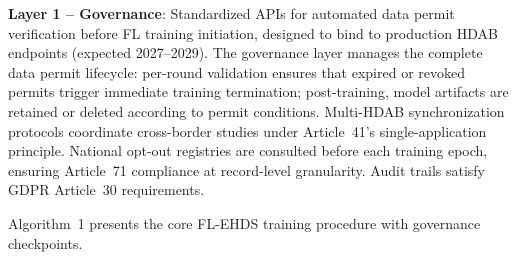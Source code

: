 \documentclass[conference]{IEEEtran}
\begin{document}
\textbf{Layer 1 -- Governance}: Standardized APIs for automated data permit verification before FL training initiation, designed to bind to production HDAB endpoints (expected 2027--2029). The governance layer manages the complete data permit lifecycle: per-round validation ensures that expired or revoked permits trigger immediate training termination; post-training, model artifacts are retained or deleted according to permit conditions. Multi-HDAB synchronization protocols coordinate cross-border studies under Article~41's single-application principle. National opt-out registries are consulted before each training epoch, ensuring Article~71 compliance at record-level granularity. Audit trails satisfy GDPR Article~30 requirements.

Algorithm~1 presents the core FL-EHDS training procedure with governance checkpoints.
\end{document}
